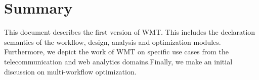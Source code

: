 \documentclass[12pt,openany,onecolumn]{book}
\begin{document}
\chapter{Summary}\label{chapt:summary}
This document describes the first version of WMT. This includes the declaration semantics of the workflow, design, analysis and optimization modules. Furthermore, we depict the work of WMT on specific use cases from the telecommunication and web analytics domains.Finally, we make an initial discussion on multi-workflow optimization. 



\end{document}
